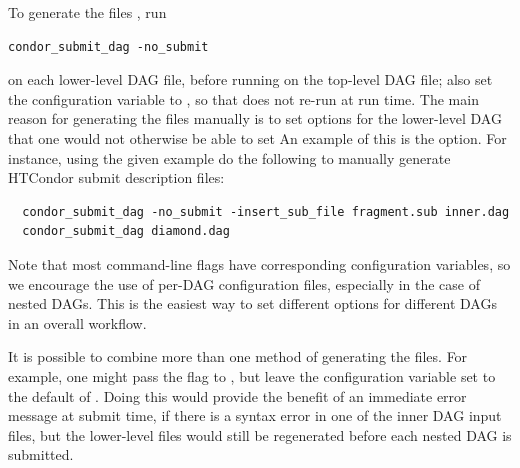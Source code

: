 \begin{itemize}
To generate the  files , 
run
\begin{verbatim}
condor_submit_dag -no_submit
\end{verbatim}
on each lower-level DAG file,
before running  on the top-level DAG file;
also set the 
configuration variable to ,
so that  does not re-run  at run time.
The main reason for
generating the  files manually is 
to set options
for the lower-level DAG that one would not otherwise be able to set
An  example of this is the   option.
For instance,
using the given example do the following to manually generate
HTCondor submit description files:

\footnotesize
\begin{verbatim}
  condor_submit_dag -no_submit -insert_sub_file fragment.sub inner.dag
  condor_submit_dag diamond.dag
\end{verbatim}
\normalsize

Note that most  command-line flags have
corresponding configuration variables, so we encourage the use of
per-DAG configuration files, especially in the case of nested DAGs.
This is the easiest way to set different options for different DAGs
in an overall workflow.

It is possible to combine more than one method of generating the
 files.
For example, one might pass the  flag to 
,
but leave the
 configuration variable set
to the default of .
Doing this would provide the benefit
of an immediate error message at submit time,
if there is a syntax error
in one of the inner DAG input files,
but the lower-level 
files would still be regenerated before each nested DAG is submitted.


\end{itemize}
